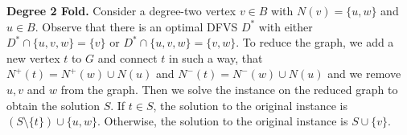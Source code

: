 
\textbf{Degree 2 Fold.}
Consider a degree-two vertex $v \in B$ with $N(v) = \{u,w\}$ and $u \in B$.
Observe that there is an optimal DFVS $D^*$ with either $D^* \cap \{u,v,w\} = \{v\}$ or $D^* \cap \{u,v,w\} = \{v,w\}$.
To reduce the graph, we add a new vertex $t$ to $G$ and connect $t$ in such a way, that $N^+(t) = N^+(w) \cup N(u)$ and $N^-(t) = N^-(w) \cup N(u)$ and we remove $u,v$ and $w$ from the graph.
Then we solve the instance on the reduced graph to obtain the solution $S$.
If $t \in S$, the solution to the original instance is $(S \setminus \{t\}) \cup \{u,w\}$.
Otherwise, the solution to the original instance is $S \cup \{v\}$.